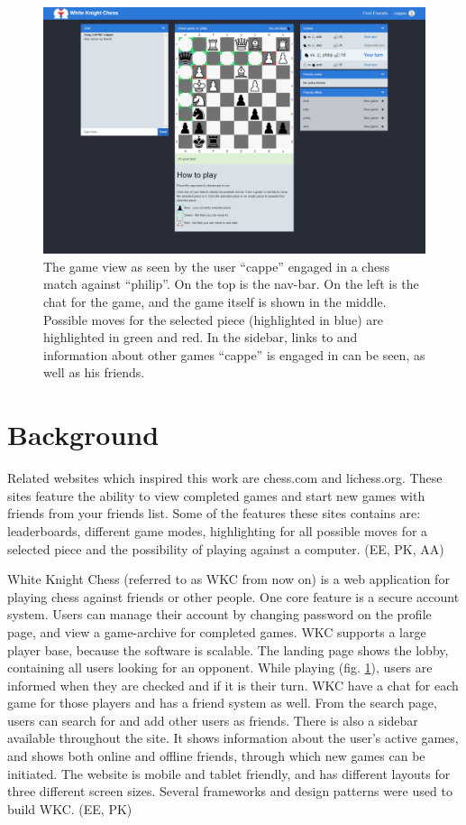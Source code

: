 \documentclass[acmlarge, review=false, screen=true]{acmart}
\begin{document}
\begin{figure}
  \includegraphics[width=\textwidth]{images/screenshot-of-WKC.png}
  \caption{The game view as seen by the user “cappe” engaged in a chess match against “philip”. On the top is the nav-bar. On the left is the chat for the game, and the game itself is shown in the middle. Possible moves for the selected piece (highlighted in blue) are highlighted in green and red. In the sidebar, links to and information about other games “cappe” is engaged in can be seen, as well as his friends.
  }
  \label{fig:game-view}
\end{figure}

\section{Background}
Related websites which inspired this work are chess.com and lichess.org\cite{chess.com, lichess.org}. These sites feature the ability to view completed games and start new games with friends from your friends list. Some of the features these sites contains are: leaderboards, different game modes, highlighting for all possible moves for a selected piece and the possibility of playing against a computer. (EE, PK, AA)

White Knight Chess (referred to as WKC from now on) is a web application for playing chess against friends or other people. One core feature is a secure account system. Users can manage their account by changing password on the profile page, and view a game-archive for completed games. WKC supports a large player base, because the software is scalable. The landing page shows the lobby, containing all users looking for an opponent. While playing (fig. \ref{fig:game-view}), users are informed when they are checked and if it is their turn. WKC have a chat for each game for those players and has a friend system as well. From the search page, users can search for and add other users as friends. There is also a sidebar available throughout the site. It shows information about the user’s active games, and shows both online and offline friends, through which new games can be initiated. The website is mobile and tablet friendly, and has different layouts for three different screen sizes. Several frameworks and design patterns were used to build WKC. (EE, PK)
\end{document}
